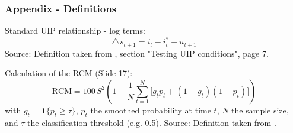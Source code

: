 \begin{frame}
    \frametitle{Appendix - Definitions}

    \begin{block}{Standard UIP relationship - log terms:}
        \begin{equation}
            \bigtriangleup s_{t + 1} = i_{t} - i_{t}^{*} + u_{t+1}
        \end{equation}
        \footnotesize{Source: Definition taken from \cite{reitz_2025_applied_econometrics_fx}, section "Testing UIP conditions", page 7.}
    \end{block}

    \begin{block}{Calculation of the RCM (Slide 17):}
        \begin{equation}
            \text{RCM} = 100\,S^{2}\left(1-\frac{1}{N}\sum_{t=1}^{N}\big[g_t p_t + (1-g_t)(1-p_t)\big]\right)
        \end{equation}
        \footnotesize{with \(g_t=\mathbf{1}\{p_t\ge\tau\}\), \(p_t\) the smoothed probability at time \(t\), \(N\) the sample size, and \(\tau\) the classification threshold (e.g. 0.5).}
        \footnotesize{Source: Definition taken from \cite{ang2002regime}.}
    \end{block}
\end{frame}